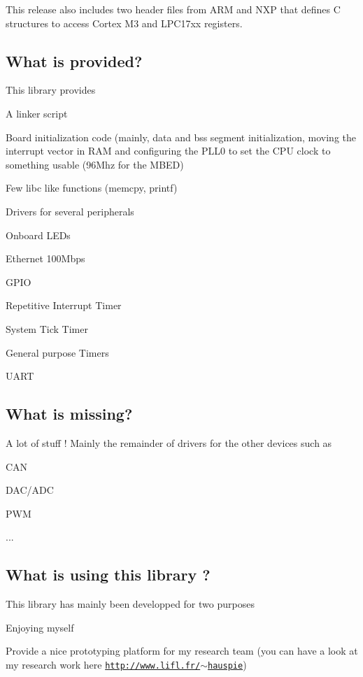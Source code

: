 This release also includes two header files from A\-R\-M and N\-X\-P that defines C structures to access Cortex M3 and L\-P\-C17xx registers.\hypertarget{start_inside}{}\subsection{What is provided?}\label{start_inside}
This library provides
\begin{DoxyItemize}
\item A linker script
\item Board initialization code (mainly, data and bss segment initialization, moving the interrupt vector in R\-A\-M and configuring the P\-L\-L0 to set the C\-P\-U clock to something usable (96\-Mhz for the M\-B\-E\-D)
\item Few libc like functions (memcpy, printf)
\item Drivers for several peripherals
\begin{DoxyItemize}
\item Onboard L\-E\-Ds
\item Ethernet 100\-Mbps
\item G\-P\-I\-O
\item Repetitive Interrupt Timer
\item System Tick Timer
\item General purpose Timers
\item U\-A\-R\-T 
\end{DoxyItemize}
\end{DoxyItemize}\hypertarget{start_missing}{}\subsection{What is missing?}\label{start_missing}
A lot of stuff ! Mainly the remainder of drivers for the other devices such as
\begin{DoxyItemize}
\item C\-A\-N
\item D\-A\-C/\-A\-D\-C
\item P\-W\-M
\item ... 
\end{DoxyItemize}\hypertarget{start_use}{}\subsection{What is using this library ?}\label{start_use}
This library has mainly been developped for two purposes
\begin{DoxyItemize}
\item Enjoying myself
\item Provide a nice prototyping platform for my research team (you can have a look at my research work here \href{http://www.lifl.fr/~hauspie}{\tt http\-://www.\-lifl.\-fr/$\sim$hauspie})
\end{DoxyItemize}

